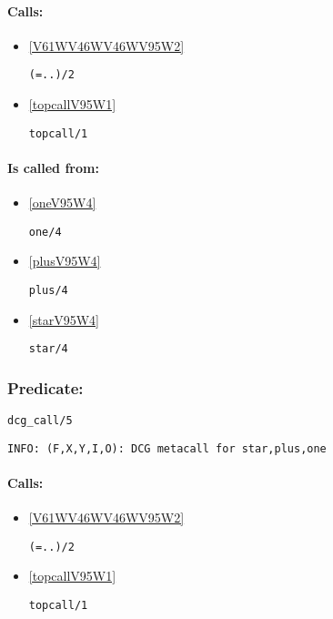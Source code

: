 \paragraph{Calls:} 
\begin{itemize}
\item \ref{V61WV46WV46WV95W2} 
\begin{verbatim}
(=..)/2
\end{verbatim}

\item \ref{topcallV95W1} 
\begin{verbatim}
topcall/1
\end{verbatim}

\end{itemize}
\paragraph{Is called from:} 
\begin{itemize}
\item \ref{oneV95W4} 
\begin{verbatim}
one/4
\end{verbatim}

\item \ref{plusV95W4} 
\begin{verbatim}
plus/4
\end{verbatim}

\item \ref{starV95W4} 
\begin{verbatim}
star/4
\end{verbatim}

\end{itemize}

\subsubsection{Predicate:} \label{dcgV95WcallV95W5}

\begin{verbatim}
dcg_call/5
\end{verbatim}

{\small \begin{verbatim}
INFO: (F,X,Y,I,O): DCG metacall for star,plus,one

\end{verbatim}}
\paragraph{Calls:} 
\begin{itemize}
\item \ref{V61WV46WV46WV95W2} 
\begin{verbatim}
(=..)/2
\end{verbatim}

\item \ref{topcallV95W1} 
\begin{verbatim}
topcall/1
\end{verbatim}

\end{itemize}

